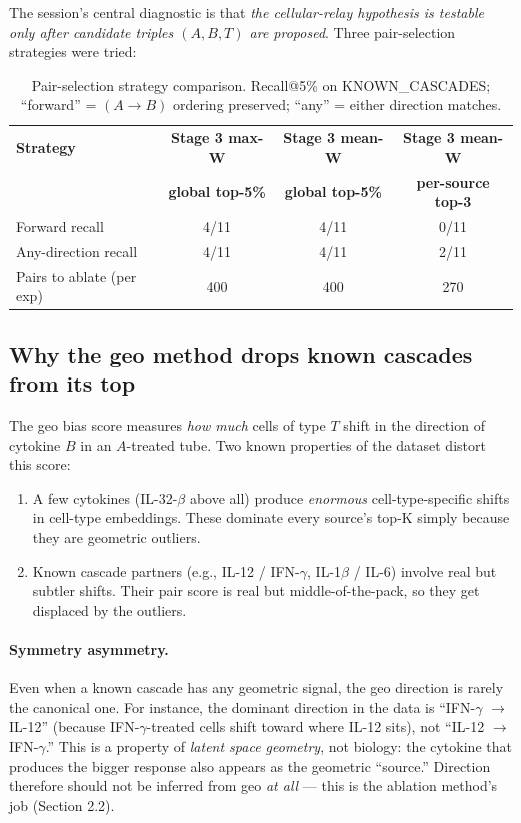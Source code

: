\documentclass[11pt,a4paper]{article}
\begin{document}
The session's central diagnostic is that \emph{the cellular-relay
hypothesis is testable only after candidate triples $(A, B, T)$ are
proposed}. Three pair-selection strategies were tried:

\begin{table}[h]
\centering
\caption{Pair-selection strategy comparison.
Recall@5\% on KNOWN\_CASCADES; ``forward'' = $(A \to B)$ ordering
preserved; ``any'' = either direction matches.}
\label{tab:strategy-comparison}
\small
\begin{tabular}{lccc}
\toprule
\textbf{Strategy} & \textbf{Stage 3 max-W} & \textbf{Stage 3 mean-W} & \textbf{Stage 3 mean-W} \\
                  & \textbf{global top-5\%} & \textbf{global top-5\%} & \textbf{per-source top-3} \\
\midrule
Forward recall    & 4/11 & 4/11 & 0/11 \\
Any-direction recall & 4/11 & 4/11 & 2/11 \\
Pairs to ablate (per exp) & 400 & 400 & 270 \\
\bottomrule
\end{tabular}
\end{table}

\subsection{Why the geo method drops known cascades from its top}

The geo bias score measures \emph{how much} cells of type $T$ shift in the
direction of cytokine $B$ in an $A$-treated tube. Two known properties of
the dataset distort this score:
\begin{enumerate}[noitemsep]
\item A few cytokines (IL-32-$\beta$ above all) produce \emph{enormous}
  cell-type-specific shifts in cell-type embeddings. These dominate
  every source's top-K simply because they are geometric outliers.
\item Known cascade partners (e.g., IL-12 / IFN-$\gamma$, IL-1$\beta$ / IL-6)
  involve real but subtler shifts. Their pair score is real but
  middle-of-the-pack, so they get displaced by the outliers.
\end{enumerate}

\paragraph{Symmetry asymmetry.} Even when a known cascade has any
geometric signal, the geo direction is rarely the canonical one. For
instance, the dominant direction in the data is
``IFN-$\gamma$ $\to$ IL-12'' (because IFN-$\gamma$-treated cells shift
toward where IL-12 sits), not ``IL-12 $\to$ IFN-$\gamma$.'' This is a
property of \emph{latent space geometry}, not biology: the cytokine that
produces the bigger response also appears as the geometric ``source.''
Direction therefore should not be inferred from geo \emph{at all} ---
this is the ablation method's job (Section 2.2).
\end{document}
